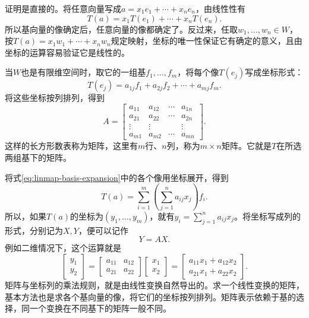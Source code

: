 证明是直接的。将任意向量写成\(a = x_{1} e_{1} + \cdots + x_{n} e_{n}\)，由线性性有
\begin{equation}\label{eq:linmap-basis-expansion}
    T \left( a \right) = x_{1} T \left( e_{1} \right) + \cdots + x_{n} T \left( e_{n} \right) .
\end{equation}
所以基向量的像确定后，任意向量的像都确定了。反过来，任取\(w_{1} , \ldots , w_{n} \in W\)，按\(T \left( a \right) = x_{1} w_{1} + \cdots + x_{n} w_{n}\)规定映射，坐标的唯一性保证它有确定的意义，且由坐标的运算容易验证它是线性的。

当\(W\)也是有限维空间时，取它的一组基\(f_{1} , \ldots , f_{m}\)，将每个像\(T \left( e_{j} \right)\)写成坐标形式：
\begin{equation}
    T \left( e_{j} \right) = a_{1 j} f_{1} + a_{2 j} f_{2} + \cdots + a_{m j} f_{m} .
\end{equation}
将这些坐标按列排列，得到
\begin{equation}
    A = \left[ \begin{matrix}
        a_{11} & a_{12} & \cdots & a_{1 n} \\
        a_{21} & a_{22} & \cdots & a_{2 n} \\
        \vdots & \vdots & & \vdots \\
        a_{m 1} & a_{m 2} & \cdots & a_{m n}
    \end{matrix} \right] .
\end{equation}
这样的长方形数表称为{\heiti{}矩阵}，这里有\(m\)行、\(n\)列，称为\(m \times n\)矩阵。它就是\(T\)在所选两组基下的矩阵。

将式\eqref{eq:linmap-basis-expansion}中的各个像用坐标展开，得到
\begin{equation}
    T \left( a \right)
    = \sum_{i = 1}^{m} \left( \sum_{j = 1}^{n} a_{i j} x_{j} \right) f_{i} .
\end{equation}
所以，如果\(T \left( a \right)\)的坐标为\(\left( y_{1} , \ldots , y_{m} \right)\)，就有\(y_{i} = \sum_{j = 1}^{n} a_{i j} x_{j}\)。将坐标写成列的形式，分别记为\(X , Y\)，便可以记作
\begin{equation}
    Y = A X .
\end{equation}
例如二维情况下，这个运算就是
\begin{equation}
    \left[ \begin{matrix}y_{1} \\ y_{2}\end{matrix} \right]
    = \left[ \begin{matrix}a_{11} & a_{12} \\ a_{21} & a_{22}\end{matrix} \right]
      \left[ \begin{matrix}x_{1} \\ x_{2}\end{matrix} \right]
    = \left[ \begin{matrix}a_{11} x_{1} + a_{12} x_{2} \\ a_{21} x_{1} + a_{22} x_{2}\end{matrix} \right] .
\end{equation}
矩阵与坐标列的乘法规则，就是由线性变换自然导出的。求一个线性变换的矩阵，基本方法也是求各个基向量的像，将它们的坐标按列排列。矩阵表示依赖于基的选择，同一个变换在不同基下的矩阵一般不同。

